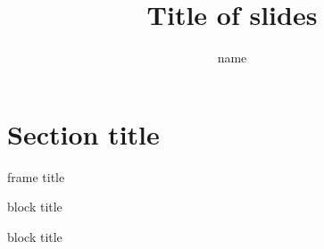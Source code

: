 \documentclass[dvipdfmx, 10pt]{toyobeam}
\title[short title]{Title of slides}
\author[name]{name}
\institute[]{東洋大学大学院理工学研究科}
\begin{document}
\frame{\maketitle}
\frame{\tableofcontents}

\section[sec. title]{Section title}
\begin{frame}{frame title}
\begin{exampleblock}{block title}
\end{exampleblock}
\begin{block}{block title}
\end{block}
\end{frame}
\end{document}
